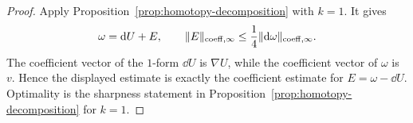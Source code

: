 \begin{proof}
Apply Proposition~\ref{prop:homotopy-decomposition} with $k=1$. It gives
\[
\omega=\mathrm{d} U+E,
\qquad
\lVert E \rVert_{\mathrm{coeff},\infty}\le\frac14\lVert \mathrm{d}\omega \rVert_{\mathrm{coeff},\infty}.
\]
The coefficient vector of the $1$-form $\dd U$ is $\nabla U$, while the
coefficient vector of $\omega$ is $v$. Hence the displayed estimate is exactly
the coefficient estimate for $E=\omega-\dd U$. Optimality is the sharpness
statement in Proposition~\ref{prop:homotopy-decomposition} for $k=1$.
\end{proof}

